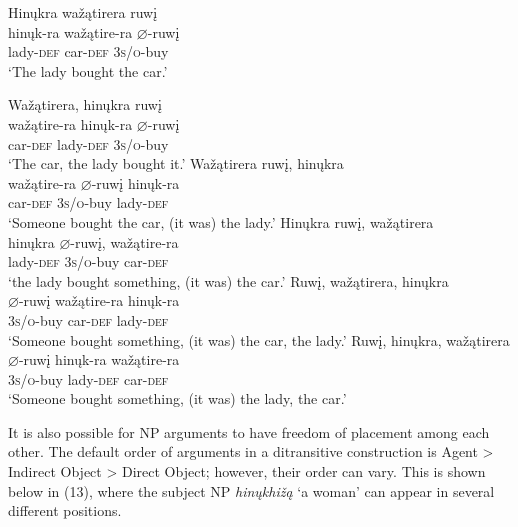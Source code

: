 \documentclass[output=paper]{LSP/langsci}
\begin{document}
\begin{exe}
\ex 
\glll Hin\k{u}kra wa\v{z}\k{a}tirera ruw\k{i}  \\
hin\k{u}k-ra	wa\v{z}\k{a}tire-ra 	$\varnothing$-ruw\k{i} \\
lady-\textsc{def}	car-\textsc{def}	 \textsc{3s/o}-buy \\
\trans `The lady bought the car.'
\ex
\begin{xlist}
\ex	
\glll Wa\v{z}\k{a}tirera,	hin\k{u}kra		ruw\k{i} \\
wa\v{z}\k{a}tire-ra 	hin\k{u}k-ra		$\varnothing$-ruw\k{i} \\
car-\textsc{def}			lady-\textsc{def}		\textsc{3s/o}-buy \\
\trans `The car, the lady bought it.'
\ex  
\glll Wa\v{z}\k{a}tirera		ruw\k{i},			hin\k{u}kra\\
wa\v{z}\k{a}tire-ra	$\varnothing$-ruw\k{i}	hin\k{u}k-ra \\
car-\textsc{def} 			\textsc{3s/o}-buy 	lady-\textsc{def} \\
\trans `Someone bought the car, (it was) the lady.'
\ex 
\glll Hin\k{u}kra 		ruw\k{i}, 		wa\v{z}\k{a}tirera \\
hin\k{u}kra 	$\varnothing$-ruw\k{i}, 		wa\v{z}\k{a}tire-ra \\
lady-\textsc{def} \textsc{3s/o}-buy car-\textsc{def} \\
\trans `the lady bought something, (it was) the car.'
\ex 
\glll Ruw\k{i}, 		wa\v{z}\k{a}tirera,	hin\k{u}kra\\
$\varnothing$-ruw\k{i}	wa\v{z}\k{a}tire-ra	hin\k{u}k-ra \\
\textsc{3s/o}-buy car-\textsc{def} lady-\textsc{def} \\
\trans `Someone bought something, (it was) the car, the lady.'
\ex 
\glll Ruw\k{i}, 		hin\k{u}kra, 	wa\v{z}\k{a}tirera \\
$\varnothing$-ruw\k{i} 	hin\k{u}k-ra 	wa\v{z}\k{a}tire-ra \\ 
\textsc{3s/o}-buy lady-\textsc{def} car-\textsc{def} \\
\trans `Someone bought something, (it was) the lady, the car.'
\end{xlist}
\end{exe}

It is also possible for NP arguments to have freedom of placement among each other. The default order of arguments in a ditransitive construction is Agent > Indirect Object > Direct Object; however, their order can vary.  This is shown below in (13), where the subject NP \textit{hin\k{u}khi\v{z}\k{a}} `a woman' can appear in several different positions.
\end{document}
